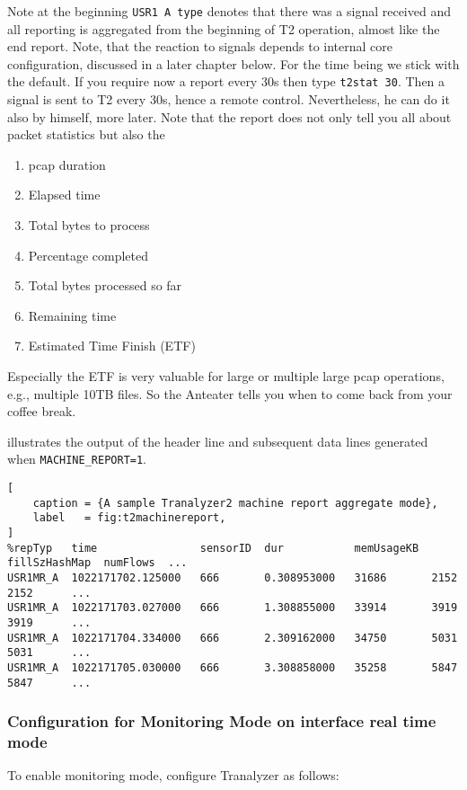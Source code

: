 Note at the beginning {\tt USR1 A type} denotes that there was a signal received and all reporting is aggregated from the beginning of T2 operation, almost like the end report.
Note, that the reaction to signals depends to internal core configuration, discussed in a later chapter below. For the time being we stick with the default.
If you require now a report every 30s then type {\tt t2stat 30}. Then a signal is sent to T2 every 30s, hence a remote control. Nevertheless, he can do it also
by himself, more later. Note that the report does not only tell you all about packet statistics but also the

\begin{enumerate}
   \item pcap duration
   \item Elapsed time
   \item Total bytes to process
   \item Percentage completed
   \item Total bytes processed so far
   \item Remaining time
   \item Estimated Time Finish (ETF)
\end{enumerate}

Especially the ETF is very valuable for large or multiple large pcap operations, e.g., multiple 10TB files.
So the Anteater tells you when to come back from your coffee break.

 illustrates the output of the header line and subsequent data lines generated when {\tt MACHINE\_REPORT=1}.
\begin{lstlisting}[
    caption = {A sample Tranalyzer2 machine report aggregate mode},
    label   = fig:t2machinereport,
]
%repTyp   time                sensorID  dur           memUsageKB  fillSzHashMap  numFlows  ...
USR1MR_A  1022171702.125000   666       0.308953000   31686       2152           2152      ...
USR1MR_A  1022171703.027000   666       1.308855000   33914       3919           3919      ...
USR1MR_A  1022171704.334000   666       2.309162000   34750       5031           5031      ...
USR1MR_A  1022171705.030000   666       3.308858000   35258       5847           5847      ...
\end{lstlisting}

\subsubsection{Configuration for Monitoring Mode on interface real time mode}
To enable monitoring mode, configure Tranalyzer as follows:

